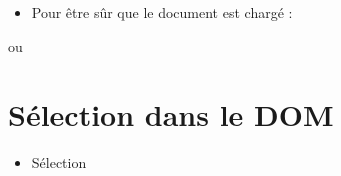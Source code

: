 \begin{itemize}
\tightlist
\item
  Pour être sûr que le document est chargé :
\end{itemize}

\begin{english}

\begin{Shaded}
\begin{Highlighting}[]
\FunctionTok{$}\NormalTok{(}\NormalTok{)}\NormalTok{(}\NormalTok{()\{}
    \NormalTok{(}\NormalTok{)}
\NormalTok{\})}\OperatorTok{;}
\end{Highlighting}
\end{Shaded}

\end{english}

ou

\begin{english}

\begin{Shaded}
\begin{Highlighting}[]
\FunctionTok{$}\NormalTok{(}\NormalTok{() \{}
    \NormalTok{(}\NormalTok{)}
\NormalTok{\})}\OperatorTok{;}
\end{Highlighting}
\end{Shaded}

\end{english}

\hypertarget{suxe9lection-dans-le-dom}{%
\section{Sélection dans le DOM}\label{suxe9lection-dans-le-dom}}

\begin{itemize}
\tightlist
\item
  Sélection
\end{itemize}

\begin{english}

\begin{Shaded}
\begin{Highlighting}[]
\FunctionTok{$}\NormalTok{(}\NormalTok{)}\OperatorTok{;}                        
\FunctionTok{$}\NormalTok{(}\NormalTok{)}\NormalTok{()}\OperatorTok{;}                 
\end{Highlighting}
\end{Shaded}

\end{english}

